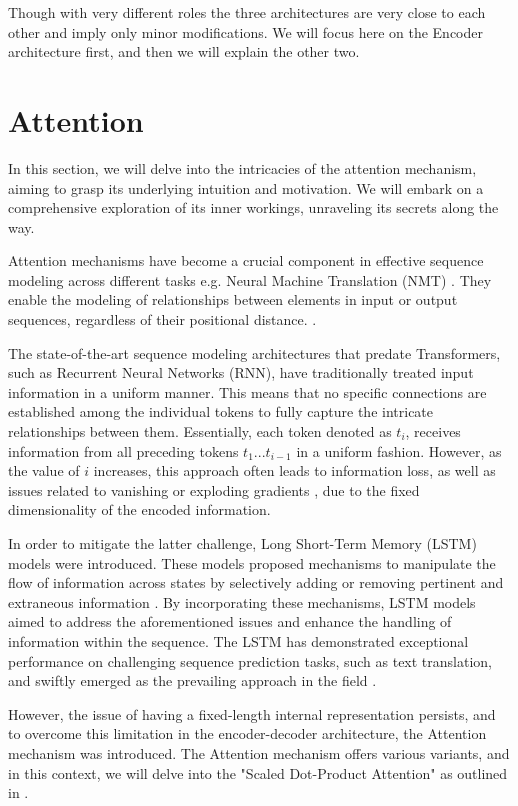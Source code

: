 Though with very different roles the three architectures are very close to each other and imply only minor modifications. We will focus here on the Encoder architecture first, and then we will explain the other two.

\section{Attention}
In this section, we will delve into the intricacies of the attention mechanism, aiming to grasp its underlying intuition and motivation. We will embark on a comprehensive exploration of its inner workings, unraveling its secrets along the way.

Attention mechanisms have become a crucial component in effective sequence modeling across different tasks e.g. Neural Machine Translation (NMT) \cite{vaswani2017attention}. They enable the modeling of relationships between elements in input or output sequences, regardless of their positional distance. \cite{bahdanau2014neural, kim2017structured}.

The state-of-the-art sequence modeling architectures that predate Transformers, such as Recurrent Neural Networks (RNN), have traditionally treated input information in a uniform manner. This means that no specific connections are established among the individual tokens to fully capture the intricate relationships between them. Essentially, each token denoted as $t_i$, receives information from all preceding tokens $t_1...t_{i-1}$ in a uniform fashion. However, as the value of $i$ increases, this approach often leads to information loss, as well as issues related to vanishing or exploding gradients \cite{hochreiter1997long}, due to the fixed dimensionality of the encoded information.

In order to mitigate the latter challenge, Long Short-Term Memory (LSTM) models were introduced. These models proposed mechanisms to manipulate the flow of information across states by selectively adding or removing pertinent and extraneous information \cite{hochreiter1997long}. By incorporating these mechanisms, LSTM models aimed to address the aforementioned issues and enhance the handling of information within the sequence.
The LSTM has demonstrated exceptional performance on challenging sequence prediction tasks, such as text translation, and swiftly emerged as the prevailing approach in the field \cite{cho2014learning, sutskever2014sequence}.

However, the issue of having a fixed-length internal representation persists, and to overcome this limitation in the encoder-decoder architecture, the Attention mechanism was introduced. The Attention mechanism offers various variants, and in this context, we will delve into the "Scaled Dot-Product Attention" as outlined in \cite{vaswani2017attention}.


